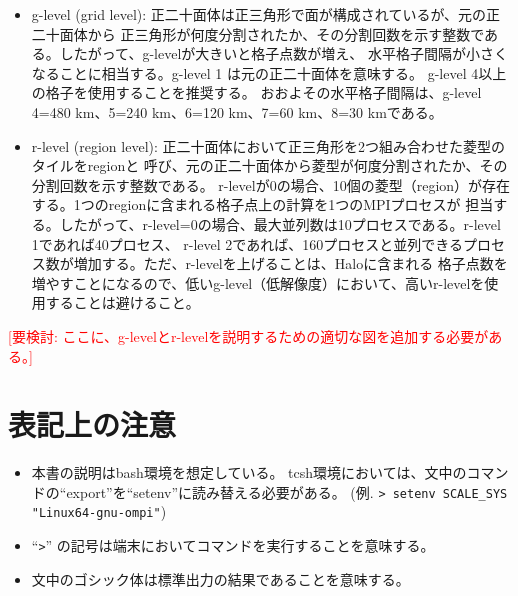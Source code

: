  \begin{itemize}
   \item g-level (grid level): 正二十面体は正三角形で面が構成されているが、元の正二十面体から
正三角形が何度分割されたか、その分割回数を示す整数である。したがって、g-levelが大きいと格子点数が増え、
水平格子間隔が小さくなることに相当する。g-level 1 は元の正二十面体を意味する。
g-level 4以上の格子を使用することを推奨する。
おおよその水平格子間隔は、g-level 4=480 km、5=240 km、6=120 km、7=60 km、8=30 kmである。
   \item r-level (region level): 正二十面体において正三角形を2つ組み合わせた菱型のタイルをregionと
呼び、元の正二十面体から菱型が何度分割されたか、その分割回数を示す整数である。
r-levelが0の場合、10個の菱型（region）が存在する。1つのregionに含まれる格子点上の計算を1つのMPIプロセスが
担当する。したがって、r-level=0の場合、最大並列数は10プロセスである。r-level 1であれば40プロセス、
r-level 2であれば、160プロセスと並列できるプロセス数が増加する。ただ、r-levelを上げることは、Haloに含まれる
格子点数を増やすことになるので、低いg-level（低解像度）において、高いr-levelを使用することは避けること。
 \end{itemize}

\textcolor{red}{[要検討: ここに、g-levelとr-levelを説明するための適切な図を追加する必要がある。]}


\section{表記上の注意}
 \begin{itemize}
   \item 本書の説明はbash環境を想定している。
         tcsh環境においては、文中のコマンドの``export''を``setenv''に読み替える必要がある。
         (例. \verb|> setenv SCALE_SYS "Linux64-gnu-ompi"|)
   \item ``\verb|>|'' の記号は端末においてコマンドを実行することを意味する。
   \item 文中のゴシック体は標準出力の結果であることを意味する。
 \end{itemize}

